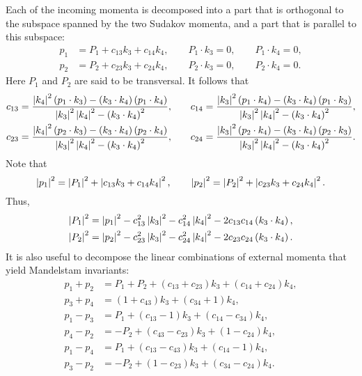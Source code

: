 Each of the incoming momenta is decomposed into a part that is orthogonal to the subspace spanned by the two Sudakov momenta, and a part that is parallel to this subspace:
\begin{align}
	p_{1} &= P_{1} + c_{13} k_{3} + c_{14} k_{4}, \qquad P_{1} \cdot k_{3} = 0, \qquad P_{1} \cdot k_{4} = 0, \\
	p_{2} &= P_{2} + c_{23} k_{3} + c_{24} k_{4}, \qquad P_{2} \cdot k_{3} = 0, \qquad P_{2} \cdot k_{4} = 0.
\end{align}
Here $P_{1}$ and $P_{2}$ are said to be transversal. It follows that
\begin{align}
	c_{13} = \frac{ \left\lvert k_{4} \right\rvert^{2} \left(p_{1} \cdot k_{3} \right) - \left(k_{3} \cdot k_{4} \right) \left(p_{1} \cdot k_{4} \right) }{\left\lvert k_{3} \right\rvert^{2} \left\lvert k_{4} \right\rvert^{2} - \left( k_{3} \cdot k_{4} \right)^{2}}, &\qquad
	c_{14} = \frac{ \left\lvert k_{3} \right\rvert^{2} \left(p_{1} \cdot k_{4} \right) - \left(k_{3} \cdot k_{4} \right) \left(p_{1} \cdot k_{3} \right) }{\left\lvert k_{3} \right\rvert^{2} \left\lvert k_{4} \right\rvert^{2} - \left( k_{3} \cdot k_{4} \right)^{2}}, \\
	c_{23} = \frac{\left\lvert k_{4} \right\rvert^{2} \left(p_{2} \cdot k_{3} \right) - \left(k_{3} \cdot k_{4} \right) \left(p_{2} \cdot k_{4} \right)}{\left\lvert k_{3} \right\rvert^{2} \left\lvert k_{4} \right\rvert^{2} - \left( k_{3} \cdot k_{4} \right)^{2}}, &\qquad
	c_{24} = \frac{ \left\lvert k_{3} \right\rvert^{2} \left(p_{2} \cdot k_{4} \right) - \left(k_{3} \cdot k_{4} \right) \left(p_{2} \cdot k_{3} \right) }{\left\lvert k_{3} \right\rvert^{2} \left\lvert k_{4} \right\rvert^{2} - \left( k_{3} \cdot k_{4} \right)^{2}}.
\end{align}
Note that
\begin{equation}
	\left\lvert p_{1} \right\rvert^{2} = \left\lvert P_{1} \right\rvert^{2} + \left\lvert c_{13} k_{3} + c_{14} k_{4} \right\rvert^{2}, \qquad \left\lvert p_{2} \right\rvert^{2} = \left\lvert P_{2} \right\rvert^{2} + \left\lvert c_{23} k_{3} + c_{24} k_{4} \right\rvert^{2}.
\end{equation}
Thus,
\begin{align}
	\left\lvert P_{1} \right\rvert^{2} &= \left\lvert p_{1} \right\rvert^{2} - c_{13}^{2} \left\lvert k_{3} \right\rvert^{2} - c_{14}^{2} \left\lvert k_{4} \right\rvert^{2} - 2 c_{13} c_{14} \left( k_{3} \cdot k_{4} \right), \\
	\left\lvert P_{2} \right\rvert^{2} &= \left\lvert p_{2} \right\rvert^{2} - c_{23}^{2} \left\lvert k_{3} \right\rvert^{2} - c_{24}^{2} \left\lvert k_{4} \right\rvert^{2} - 2 c_{23} c_{24} \left( k_{3} \cdot k_{4} \right).
\end{align}
It is also useful to decompose the linear combinations of external momenta that yield Mandelstam invariants:
\begin{align}
	p_{1} + p_{2} &= P_{1} + P_{2} + \left(c_{13} + c_{23}\right) k_{3} + \left(c_{14} + c_{24}\right) k_{4}, \\
	p_{3} + p_{4} &= \left(1 + c_{43}\right) k_{3} + \left(c_{34} + 1\right) k_{4}, \\
	p_{1} - p_{3} &= P_{1} + \left(c_{13} - 1\right) k_{3} + \left(c_{14} - c_{34}\right) k_{4}, \\
	p_{4} - p_{2} &= -P_{2} + \left(c_{43} - c_{23}\right) k_{3} + \left(1 - c_{24}\right) k_{4}, \\
	p_{1} - p_{4} &= P_{1} + \left(c_{13} - c_{43}\right) k_{3} + \left(c_{14} - 1\right) k_{4}, \\
	p_{3} - p_{2} &= -P_{2} + \left(1 - c_{23}\right) k_{3} + \left(c_{34} - c_{24}\right) k_{4}.
\end{align}
